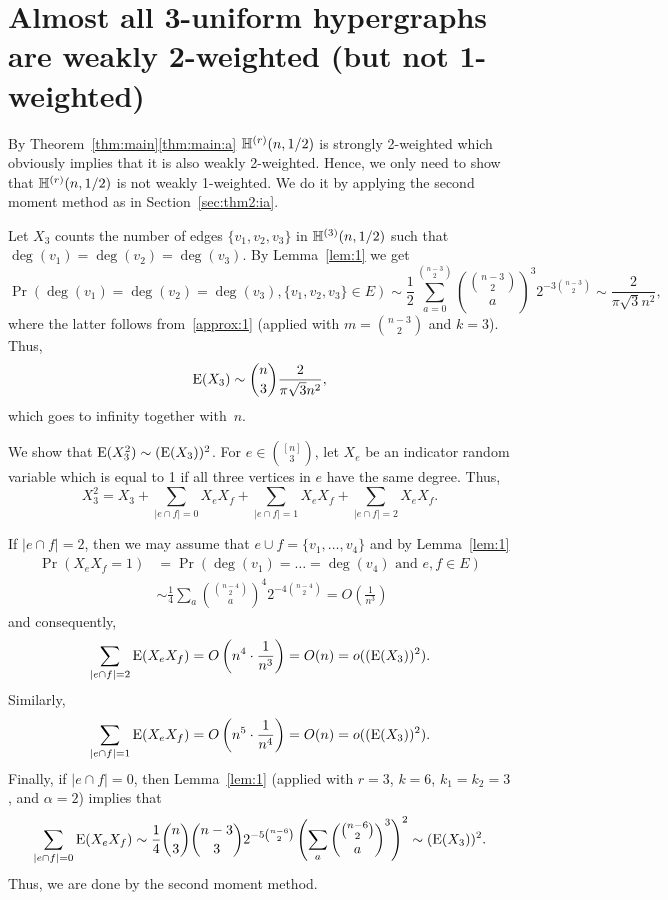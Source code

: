 \documentclass[12pt,reqno]{amsart}
\begin{document}
\section{Almost all 3-uniform hypergraphs are weakly 2-weighted (but not 1-weighted)}\label{sec:thm3:ii}

By Theorem~\ref{thm:main}\ref{thm:main:a} \whp $\mathbb{H}^{({r})}(n,1/2)$ is strongly 2-weighted which obviously implies that it is also weakly 2-weighted. Hence, we only need to show that \whp $\mathbb{H}^{({r})}(n,1/2)$ is not weakly 1-weighted. We do it by applying the second moment method as in Section~\ref{sec:thm2:ia}.

Let $X_{3}$ counts the number of edges $\{v_1,v_2,v_3\}$ in $\mathbb{H}^{({3})}(n,1/2)$ such that $\deg(v_1)=\deg(v_2)=\deg(v_3)$. By Lemma~\ref{lem:1} we get
\[
\Pr(\deg(v_1) = \deg(v_2) = \deg(v_3), \{v_1, v_2, v_3\} \in E) 
\sim \frac{1}{2}\sum_{a=0}^{\binom{n-3}{2}} \binom{\binom{n-3}{2}}{a}^3 2^{-3\binom{n-3}{2}}
\sim \frac{2}{\pi \sqrt{3} n^2 },
\]
where the latter follows from~\ref{approx:1} (applied with $m=\binom{n-3}{2}$ and $k=3$). Thus,
\[
\mathrm{E}(X_3) \sim \binom{n}{3} \frac{2}{\pi \sqrt{3} n^2 },
\]
which goes to infinity together with~$n$.

We show that $\mathrm{E}(X_3^2) \sim (\mathrm{E}(X_3))^2$. For $e\in \binom{[n]}{3}$,
let $X_e$ be an indicator random variable which is equal to 1 if all three vertices in $e$ have the same degree.
Thus,
\[
X_3^2 = X_3 + \sum_{|e\cap f| = 0} X_{e} X_{f} + \sum_{|e\cap f| = 1} X_{e} X_{f} + \sum_{|e\cap f| = 2} X_{e} X_{f}.
\]

If $|e\cap f|=2$, then we may assume that $e\cup f = \{v_1,\dots,v_4\}$ and by Lemma~\ref{lem:1}
\begin{align*}
\Pr(X_eX_f=1) &= \Pr(\deg(v_1)=\dots=\deg(v_4) \mbox{ and } e,f\in E)\\
&\sim \frac{1}{4}\sum_{a} \binom{\binom{n-4}{2}}{a}^4 2^{-4\binom{n-4}{2}}
=O\left( \frac{1}{n^3} \right)
\end{align*}
and consequently,
\[
\sum_{|e\cap f| = 2} \mathrm{E}(X_{e} X_{f}) = O\left( n^4 \cdot \frac{1}{n^3} \right)=  O(n) = o((\mathrm{E}(X_3))^2).
\]
Similarly,
\[
\sum_{|e\cap f| = 1} \mathrm{E}(X_{e} X_{f}) = O\left( n^5 \cdot \frac{1}{n^4} \right)=  O(n) = o((\mathrm{E}(X_3))^2).
\]
Finally, if $|e\cap f|=0$, then Lemma~\ref{lem:1} (applied with $r=3$, $k=6$, $k_1=k_2=3$, and $\alpha=2$) implies that
\[
\sum_{|e\cap f| = 0} \mathrm{E}(X_{e} X_{f}) \sim \frac{1}{4}\binom{n}{3} \binom{n-3}{3} 2^{-5\binom{n-6}{2}} \left( \sum_{a} \binom{\binom{n-6}{2}}{a}^3 \right)^2 \sim (\mathrm{E}(X_3))^2.
\]
Thus, we are done by the second moment method.
\end{document}
